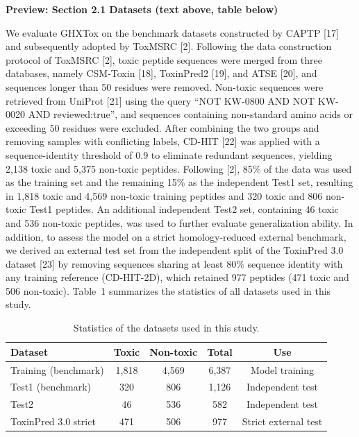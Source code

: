 ﻿\documentclass[11pt]{article}
\begin{document}
\noindent\textbf{Preview: Section 2.1 Datasets (text above, table below)}

We evaluate GHXTox on the benchmark datasets constructed by CAPTP [17] and
subsequently adopted by ToxMSRC [2]. Following the data construction protocol
of ToxMSRC [2], toxic peptide sequences were merged from three databases,
namely CSM-Toxin [18], ToxinPred2 [19], and ATSE [20], and sequences longer
than 50 residues were removed. Non-toxic sequences were retrieved from UniProt
[21] using the query ``NOT KW-0800 AND NOT KW-0020 AND reviewed:true'', and
sequences containing non-standard amino acids or exceeding 50 residues were
excluded. After combining the two groups and removing samples with conflicting
labels, CD-HIT [22] was applied with a sequence-identity threshold of 0.9 to
eliminate redundant sequences, yielding 2{,}138 toxic and 5{,}375 non-toxic
peptides. Following [2], 85\% of the data was used as the training set and the
remaining 15\% as the independent Test1 set, resulting in 1{,}818 toxic and
4{,}569 non-toxic training peptides and 320 toxic and 806 non-toxic Test1
peptides. An additional independent Test2 set, containing 46 toxic and 536
non-toxic peptides, was used to further evaluate generalization ability. In
addition, to assess the model on a strict homology-reduced external benchmark,
we derived an external test set from the independent split of the ToxinPred 3.0
dataset [23] by removing sequences sharing at least 80\% sequence identity with
any training reference (CD-HIT-2D), which retained 977 peptides (471 toxic and
506 non-toxic). Table~1 summarizes the statistics of all datasets used in this
study.

\begin{table}[htbp]
    \centering
    \caption{Statistics of the datasets used in this study.}
    \label{tab:datasets}
    \begin{tabular}{lcccc}
        \toprule
        Dataset & Toxic & Non-toxic & Total & Use \\
        \midrule
        Training (benchmark) & 1,818 & 4,569 & 6,387 & Model training \\
        Test1 (benchmark)    &   320 &   806 & 1,126 & Independent test \\
        Test2                &    46 &   536 &   582 & Independent test \\
        ToxinPred 3.0 strict &   471 &   506 &   977 & Strict external test \\
        \bottomrule
    \end{tabular}
\end{table}
\end{document}
